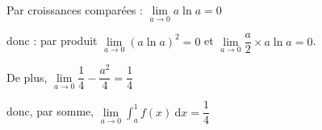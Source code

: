 \documentclass[10pt]{article}
\begin{document}
\begin{enumerate}
\begin{enumerate}
Par croissances comparées : $\lim\limits_{a \to 0} a \ln a = 0$ 

donc : par produit $\lim\limits_{a \to 0} \left(a \ln a \right)^2= 0$ et $\lim\limits_{a \to 0} \dfrac{a}{2} \times a\ln a=0$.

De plus, $\lim\limits_{a \to 0}  \dfrac{1}{4} - \dfrac{a^2}{4}=\dfrac{1}{4}$ 

donc, par somme, $\lim\limits_{a \to 0 }	\displaystyle\int_a^1 f(x)\: \text{d}x  = \dfrac{1}{4}$

	\end{enumerate}
\end{enumerate}
\end{document}
